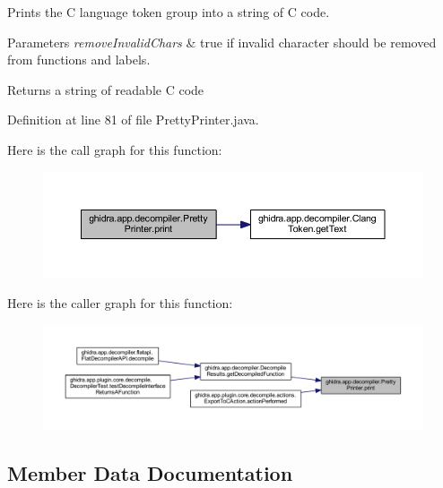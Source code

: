 Prints the C language token group into a string of C code. 
\begin{DoxyParams}{Parameters}
{\em remove\+Invalid\+Chars} & true if invalid character should be removed from functions and labels. \\
\hline
\end{DoxyParams}
\begin{DoxyReturn}{Returns}
a string of readable C code 
\end{DoxyReturn}


Definition at line 81 of file Pretty\+Printer.\+java.

Here is the call graph for this function\+:
\nopagebreak
\begin{figure}[H]
\begin{center}
\leavevmode
\includegraphics[width=350pt]{classghidra_1_1app_1_1decompiler_1_1_pretty_printer_ad36d28e52e9493186ac184c569f19fa9_cgraph}
\end{center}
\end{figure}
Here is the caller graph for this function\+:
\nopagebreak
\begin{figure}[H]
\begin{center}
\leavevmode
\includegraphics[width=350pt]{classghidra_1_1app_1_1decompiler_1_1_pretty_printer_ad36d28e52e9493186ac184c569f19fa9_icgraph}
\end{center}
\end{figure}


\subsection{Member Data Documentation}
\mbox{\label{classghidra_1_1app_1_1decompiler_1_1_pretty_printer_a34a5c2dccbb9edc5153449f577118a0e}} 
